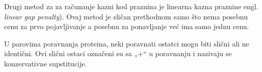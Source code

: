 Drugi metod za za računanje kazni kod praznina je linearna kazna praznine engl. \textit{linear gap penalty}). Ovaj metod je sličan prethodnom samo što nema posebnu cenu za prvo pojavljivanje a posebnu za ponavljanje već ima samo jednu cenu.
 
U parovima poravnanja proteina, neki poravnati ostatci mogu biti slični ali ne identični. Ovi slični ostaci označeni su sa „+“ u poravnanju i nazivaju se konzervativne supstitucije.